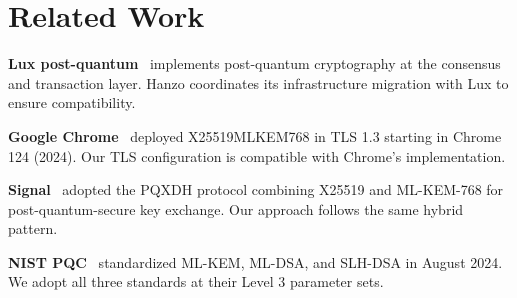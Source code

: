 \section{Related Work}

\label{sec:related}

\textbf{Lux post-quantum}~\cite{luxwhitepaper} implements post-quantum
cryptography at the consensus and transaction layer. Hanzo coordinates its
infrastructure migration with Lux to ensure compatibility.

\textbf{Google Chrome}~\cite{chromepq} deployed X25519MLKEM768 in TLS 1.3
starting in Chrome 124 (2024). Our TLS configuration is compatible with
Chrome's implementation.

\textbf{Signal}~\cite{signalpq} adopted the PQXDH protocol combining X25519
and ML-KEM-768 for post-quantum-secure key exchange. Our approach follows the
same hybrid pattern.

\textbf{NIST PQC}~\cite{nistpq} standardized ML-KEM, ML-DSA, and SLH-DSA in
August 2024. We adopt all three standards at their Level 3 parameter sets.

